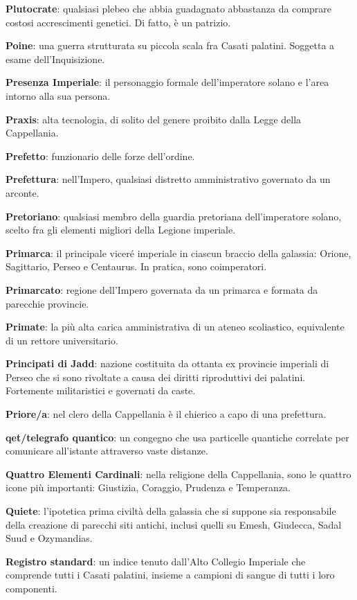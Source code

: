\textbf{Plutocrate}: qualsiasi plebeo che abbia guadagnato abbastanza da
comprare costosi accrescimenti genetici. Di fatto, è un patrizio.

\textbf{Poine}: una guerra strutturata su piccola scala fra Casati
palatini. Soggetta a esame dell'Inquisizione.

\textbf{Presenza Imperiale}: il personaggio formale dell'imperatore
solano e l'area intorno alla sua persona.

\textbf{Praxis}: alta tecnologia, di solito del genere proibito dalla
Legge della Cappellania.

\textbf{Prefetto}: funzionario delle forze dell'ordine.

\textbf{Prefettura}: nell'Impero, qualsiasi distretto amministrativo
governato da un arconte.

\textbf{Pretoriano}: qualsiasi membro della guardia pretoriana
dell'imperatore solano, scelto fra gli elementi migliori della Legione
imperiale.

\textbf{Primarca}: il principale viceré imperiale in ciascun braccio
della galassia: Orione, Sagittario, Perseo e Centaurus. In pratica, sono
coimperatori.

\textbf{Primarcato}: regione dell'Impero governata da un primarca e
formata da parecchie provincie.

\textbf{Primate}: la più alta carica amministrativa di un ateneo
scoliastico, equivalente di un rettore universitario.

\textbf{Principati di Jadd}: nazione costituita da ottanta ex provincie
imperiali di Perseo che si sono rivoltate a causa dei diritti
riproduttivi dei palatini. Fortemente militaristici e governati da
caste.

\textbf{Priore/a}: nel clero della Cappellania è il chierico a capo di
una prefettura.

\textbf{qet/telegrafo quantico}: un congegno che usa particelle
quantiche correlate per comunicare all'istante attraverso vaste
distanze.

\textbf{Quattro Elementi Cardinali}: nella religione della Cappellania,
sono le quattro icone più importanti: Giustizia, Coraggio, Prudenza e
Temperanza.

\textbf{Quiete}: l'ipotetica prima civiltà della galassia che si suppone
sia responsabile della creazione di parecchi siti antichi, inclusi
quelli su Emesh, Giudecca, Sadal Suud e Ozymandias.

\textbf{Registro standard}: un indice tenuto dall'Alto Collegio
Imperiale che comprende tutti i Casati palatini, insieme a campioni di
sangue di tutti i loro componenti.

